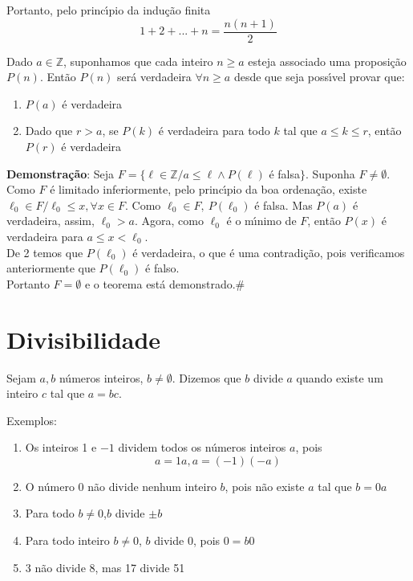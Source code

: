 Portanto, pelo princ{\'\i}pio da indu{\c c}{\~a}o finita \[1+2+...+n=\displaystyle\frac{n(n+1)}{2}\]

\begin{teorema} Dado $a\in\mathbb{Z}$, suponhamos que cada inteiro $n\geq a$ esteja associado uma proposi{\c c}{\~a}o $P(n)$. Ent{\~a}o $P(n)$ ser{\'a} verdadeira $\forall n\geq a$ desde que seja poss{\'\i}vel provar que:
\begin{enumerate}
\item $P(a)$ {\'e} verdadeira
\item Dado que $r>a$, se $P(k)$ {\'e} verdadeira para todo $k$ tal que $a\leq k\leq r$, ent{\~a}o $P(r)$ {\'e} verdadeira
\end{enumerate}
\end{teorema}

\textbf{Demonstra{\c c}{\~a}o}: Seja $F=\{\ell\in\mathbb{Z}/a\leq\ell\wedge P(\ell)$ {\'e} falsa$\}$. Suponha $F\neq\emptyset$. Como $F$ {\'e} limitado inferiormente, pelo princ{\'\i}pio da boa ordena{\c c}{\~a}o, existe $\ell_{0}\in F/\ell_{0}\leq x,\forall x\in F$. Como $\ell_{0}\in F,\ P(\ell_{0})$ {\'e} falsa. Mas $P(a)$ {\'e} verdadeira, assim, $\ell_{0}>a$. Agora, como $\ell_{0}$ {\'e} o m{\'\i}nimo de $F$, ent{\~a}o $P(x)$ {\'e} verdadeira para $a\leq x<\ell_{0}$.\\

De 2 temos que $P(\ell_{0})$ {\'e} verdadeira, o que {\'e} uma contradi{\c c}{\~a}o, pois verificamos anteriormente que $P(\ell_{0})$ {\'e} falso.\\

Portanto $F=\emptyset$ e o teorema est{\'a} demonstrado.\#

\section{Divisibilidade}

\begin{definicao}[Divis{\~a}o] Sejam $a,b$ n{\'u}meros inteiros, $b\neq\emptyset$. Dizemos que $b$ divide $a$ quando existe um inteiro $c$ tal que $a=bc$.\end{definicao}

Exemplos:
\begin{enumerate}
\item Os inteiros 1 e $-1$ dividem todos os n{\'u}meros inteiros $a$, pois \[a=1a,a=(-1)(-a)\]
\item O n{\'u}mero 0 n{\~a}o divide nenhum inteiro $b$, pois n{\~a}o existe $a$ tal que $b=0a$
\item Para todo $b\neq 0$,$b$ divide $\pm b$
\item Para todo inteiro $b\neq 0$, $b$ divide 0, pois $0=b0$
\item 3 n{\~a}o divide 8, mas 17 divide 51
\end{enumerate}


